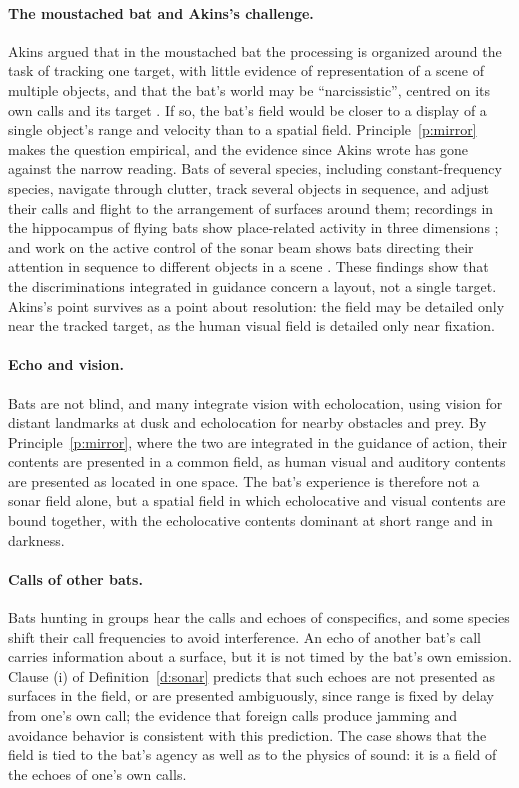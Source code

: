\documentclass{situationist-preprint}
\begin{document}
\paragraph{The moustached bat and Akins's challenge.} Akins argued that in the moustached bat the processing is organized around the task of tracking one target, with little evidence of representation of a scene of multiple objects, and that the bat's world may be \enquote{narcissistic}, centred on its own calls and its target \citep{Akins1993}. If so, the bat's field would be closer to a display of a single object's range and velocity than to a spatial field. Principle~\ref{p:mirror} makes the question empirical, and the evidence since Akins wrote has gone against the narrow reading. Bats of several species, including constant-frequency species, navigate through clutter, track several objects in sequence, and adjust their calls and flight to the arrangement of surfaces around them; recordings in the hippocampus of flying bats show place-related activity in three dimensions \citep{Yartsev2013}; and work on the active control of the sonar beam shows bats directing their attention in sequence to different objects in a scene \citep{UlanovskyMoss2008,MossSurlykke2010}. These findings show that the discriminations integrated in guidance concern a layout, not a single target. Akins's point survives as a point about resolution: the field may be detailed only near the tracked target, as the human visual field is detailed only near fixation.

\paragraph{Echo and vision.} Bats are not blind, and many integrate vision with echolocation, using vision for distant landmarks at dusk and echolocation for nearby obstacles and prey. By Principle~\ref{p:mirror}, where the two are integrated in the guidance of action, their contents are presented in a common field, as human visual and auditory contents are presented as located in one space. The bat's experience is therefore not a sonar field alone, but a spatial field in which echolocative and visual contents are bound together, with the echolocative contents dominant at short range and in darkness.

\paragraph{Calls of other bats.} Bats hunting in groups hear the calls and echoes of conspecifics, and some species shift their call frequencies to avoid interference. An echo of another bat's call carries information about a surface, but it is not timed by the bat's own emission. Clause (i) of Definition~\ref{d:sonar} predicts that such echoes are not presented as surfaces in the field, or are presented ambiguously, since range is fixed by delay from one's own call; the evidence that foreign calls produce jamming and avoidance behavior is consistent with this prediction. The case shows that the field is tied to the bat's agency as well as to the physics of sound: it is a field of the echoes of one's own calls.
\end{document}
